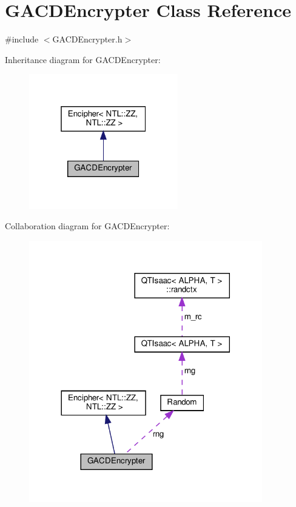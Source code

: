 \hypertarget{classGACDEncrypter}{}\section{G\+A\+C\+D\+Encrypter Class Reference}
\label{classGACDEncrypter}


{\ttfamily \#include $<$G\+A\+C\+D\+Encrypter.\+h$>$}



Inheritance diagram for G\+A\+C\+D\+Encrypter\+:\nopagebreak
\begin{figure}[H]
\begin{center}
\leavevmode
\includegraphics[width=184pt]{classGACDEncrypter__inherit__graph}
\end{center}
\end{figure}


Collaboration diagram for G\+A\+C\+D\+Encrypter\+:\nopagebreak
\begin{figure}[H]
\begin{center}
\leavevmode
\includegraphics[width=288pt]{classGACDEncrypter__coll__graph}
\end{center}
\end{figure}
